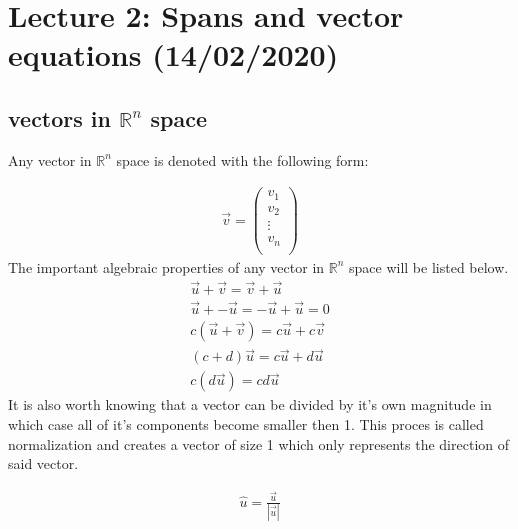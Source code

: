 \documentclass[11pt, a4paper]{article}
\begin{document}
\setcounter{section}{1}
\section{Lecture 2: Spans and vector equations (14/02/2020)}

\subsection{vectors in $\mathbb{R}^n$ space}
Any vector in $\mathbb{R}^n$ space is denoted with the following form:

\begin{align*}
    \vec{v} =
    \begin{pmatrix}
        v_1\\
        v_2\\
        \vdots \\
        v_n\\
    \end{pmatrix}
\end{align*}
The important algebraic properties of any vector in $\mathbb{R}^n$ space will be listed below.
\begin{gather}
    \vec{u} + \vec{v} = \vec{v} + \vec{u}\\
    \vec{u} + -\vec{u} = -\vec{u} + \vec{u} = 0\\
    c(\vec{u} + \vec{v}) = c\vec{u} + c\vec{v}\\
    (c + d)\vec{u} = c\vec{u} + d\vec{u}\\
    c(d\vec{u}) = cd\vec{u}
\end{gather}
It is also worth knowing that a vector can be divided by it's own magnitude in which case all of
it's components become smaller then 1. This proces is called normalization and creates a vector of size 1
which only represents the direction of said vector.

\begin{align*}
    \hat{u} = \frac{\vec{u}}{|\vec{u}|}
\end{align*}
\end{document}
